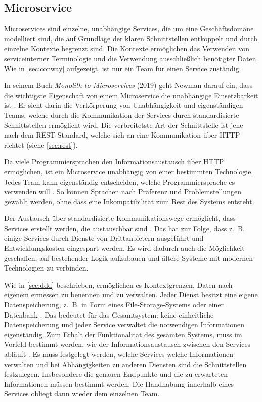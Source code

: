 \subsection{Microservice}

Microservices sind einzelne, unabhängige Services, die um eine Geschäftsdomäne modelliert sind, die auf Grundlage der klaren Schnittstellen entkoppelt und durch einzelne Kontexte begrenzt sind. Die Kontexte ermöglichen das Verwenden von serviceinterner Terminologie und die Verwendung ausschließlich benötigter Daten. Wie in \cref{sec:conway} aufgezeigt, ist nur ein Team für einen Service zuständig.

In seinem Buch \textit{Monolith to Microservices} (2019) geht Newman darauf ein, dass die wichtigste Eigenschaft von einem Microservice die unabhängige Einsetzbarkeit ist \parencite[vgl.][Kap. 2.1.1]{newman_monolith_2019}. Er sieht darin die Verkörperung von Unabhängigkeit und eigenständigen Teams, welche durch die Kommunikation der Services durch standardisierte Schnittstellen ermöglicht wird. Die verbreitetste Art der Schnittstelle ist jene nach dem REST-Standard, welche sich an eine Kommunikation über HTTP richtet (siehe \cref{sec:rest}).
 
Da viele Programmiersprachen den Informationsaustausch über HTTP ermöglichen, ist ein Microservice unabhängig von einer bestimmten Technologie. Jedes Team kann eigenständig entscheiden, welche Programmiersprache es verwenden will \parencite[vgl.][Kap. 1.2]{wolff_microservices_2018}. So können Sprachen nach Präferenz und Problemstellungen gewählt werden, ohne dass eine Inkompatibilität zum Rest des Systems entsteht.

Der Austausch über standardisierte Kommunikationswege ermöglicht, dass Services erstellt werden, die austauschbar sind \parencite[vgl.][Kap. 1.2]{wolff_microservices_2018}. Das hat zur Folge, dass z.~B. einige Services durch Dienste von Drittanbietern ausgeführt und Entwicklungskosten eingespart werden. Es wird dadurch auch die Möglichkeit geschaffen, auf bestehender Logik aufzubauen und ältere Systeme mit modernen Technologien zu verbinden.

Wie in \cref{sec:ddd} beschrieben, ermöglichen es Kontextgrenzen, Daten nach eigenem ermessen zu benennen und zu verwalten. Jeder Dienst besitzt eine eigene Datenspeicherung, z.~B. in Form eines File-Storage-Systems oder einer Datenbank \parencite[vgl.][Kap. 2.1.3]{newman_monolith_2019}. Das bedeutet für das Gesamtsystem: keine einheitliche Datenspeicherung und jeder Service verwaltet die notwendigen Informationen eigenständig. Zum Erhalt der Funktionalität des gesamten Systems, muss im Vorfeld bestimmt werden, wie der Informationsaustausch zwischen den Services abläuft \parencite[vgl.][Kap. 4.1]{wolff_microservices_2018}. Es muss festgelegt werden, welche Services welche Informationen verwalten und bei Abhängigkeiten zu anderen Diensten sind die Schnittstellen festzulegen. Insbesondere die genauen Endpunkte und die zu erwarteten Informationen müssen bestimmt werden. Die Handhabung innerhalb eines Services obliegt dann wieder dem einzelnen Team. 

